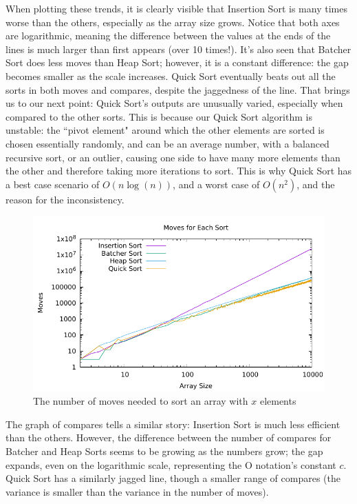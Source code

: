 \documentclass[12pt]{article}
\begin{document}
When plotting these trends, it is clearly visible that Insertion Sort is many times worse than the others, especially as the array size grows. Notice that both axes are logarithmic, meaning the difference between the values at the ends of the lines is much larger than first appears (over 10 times!). It's also seen that Batcher Sort does less moves than Heap Sort; however, it is a constant difference: the gap becomes smaller as the scale increases. Quick Sort eventually beats out all the sorts in both moves and compares, despite the jaggedness of the line. That brings us to our next point: Quick Sort's outputs are unusually varied, especially when compared to the other sorts. This is because our Quick Sort algorithm is unstable: the ``pivot element" around which the other elements are sorted is chosen essentially randomly, and can be an average number, with a balanced recursive sort, or an outlier, causing one side to have many more elements than the other and therefore taking more iterations to sort. This is why Quick Sort has a best case scenario of $O(n\log(n))$, and a worst case of $O(n^2)$, and the reason for the inconsistency.


\begin{figure}[H]\begin{centering}
\includegraphics{plots/moves.pdf}\caption{The number of moves needed to sort an array with $x$ elements}
\end{centering}\end{figure}

The graph of compares tells a similar story: Insertion Sort is much less efficient than the others. However, the difference between the number of compares for Batcher and Heap Sorts seems to be growing as the numbers grow; the gap expands, even on the logarithmic scale, representing the O notation's constant $c$. Quick Sort has a similarly jagged line, though a smaller range of compares (the variance is smaller than the variance in the number of moves).
\end{document}

